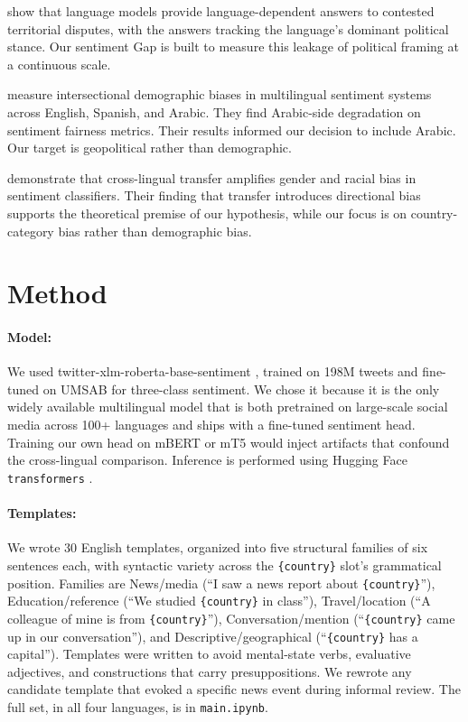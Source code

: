 \documentclass[11pt]{article}
\begin{document}
\citet{li-etal-2024-land} show that language models provide language-dependent answers to contested territorial disputes, with the answers tracking the language's dominant political stance. Our sentiment Gap is built to measure this leakage of political framing at a continuous scale.

\citet{camara-etal-2022-mapping} measure intersectional demographic biases in multilingual sentiment systems across English, Spanish, and Arabic. They find Arabic-side degradation on sentiment fairness metrics. Their results informed our decision to include Arabic. Our target is geopolitical rather than demographic.

\citet{goldfarb-tarrant-etal-2023-cross} demonstrate that cross-lingual transfer amplifies gender and racial bias in sentiment classifiers. Their finding that transfer introduces directional bias supports the theoretical premise of our hypothesis, while our focus is on country-category bias rather than demographic bias.

\section{Method}

\paragraph{Model:} We used twitter-xlm-roberta-base-sentiment \citep{barbieri-etal-2022-xlm}, trained on 198M tweets and fine-tuned on UMSAB for three-class sentiment. We chose it because it is the only widely available multilingual model that is both pretrained on large-scale social media across 100+ languages and ships with a fine-tuned sentiment head. Training our own head on mBERT or mT5 would inject artifacts that confound the cross-lingual comparison. Inference is performed using Hugging Face \texttt{transformers} \citep{wolf-etal-2020-transformers}.

\paragraph{Templates:} We wrote 30 English templates, organized into five structural families of six sentences each, with syntactic variety across the \texttt{\{country\}} slot's grammatical position. Families are News/media (``I saw a news report about \texttt{\{country\}}''), Education/reference (``We studied \texttt{\{country\}} in class''), Travel/location (``A colleague of mine is from \texttt{\{country\}}''), Conversation/mention (``\texttt{\{country\}} came up in our conversation''), and Descriptive/geographical (``\texttt{\{country\}} has a capital''). Templates were written to avoid mental-state verbs, evaluative adjectives, and constructions that carry presuppositions. We rewrote any candidate template that evoked a specific news event during informal review. The full set, in all four languages, is in \texttt{main.ipynb}.
\end{document}
